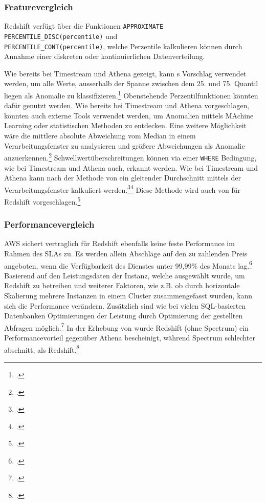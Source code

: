 \subsubsection{Featurevergleich}
Redshift verfügt über die Funktionen \texttt{APPROXIMATE PERCENTILE_DISC(percentile)} und \\ \texttt{PERCENTILE_CONT(percentile)}, welche Perzentile kalkulieren können durch Annahme einer diskreten oder kontinuierlichen Datenverteilung.

Wie bereits bei Timestream und Athena gezeigt, kann \citeauthor{Salgado.2019}s Vorschlag verwendet werden, um alle Werte, ausserhalb der Spanne zwischen dem 25. und 75. Quantil liegen als Anomalie zu klassifizieren.\footcite[Vgl.][]{Salgado.2019} Obenstehende Perzentilfunktionen könnten dafür genutzt werden. Wie bereits bei Timestream und Athena vorgeschlagen, könnten auch externe Tools verwendet werden, um Anomalien mittels MAchine Learning oder statistischen Methoden zu entdecken. Eine weitere Möglichkeit wäre die mittlere absolute Abweichung vom Median in einem Verarbeitungsfenster zu analysieren und größere Abweichungen als Anomalie anzuerkennen.\footcite[Vgl.][]{Peak.2017}
Schwellwertüberschreitungen können via einer \texttt{WHERE} Bedingung, wie bei Timestream und Athena auch, erkannt werden.
Wie bei Timestream und Athena kann nach der Methode von \citeauthor{Ross.2020} ein gleitender Durchschnitt mittels der Verarbeitungsfenster kalkuliert werden.\footcite[Vgl.][]{Ross.2020}\nzitat\footcite[Vgl.][]{Ubiq.o.J.} Diese Methode wird auch von \citeauthor{Ubiq.o.J.} für Redshift vorgeschlagen.\footcite[Vgl.][]{Ubiq.o.J.}

\subsubsection{Performancevergleich}
\ac{AWS} sichert vertraglich für Redshift ebenfalls keine feste Performance im Rahmen des \acp{SLA} zu. Es werden allein Abschläge auf den zu zahlenden Preis angeboten, wenn die Verfügbarkeit des Dienstes unter 99,99\% des Monats lag.\footcite[Vgl.][]{AmazonWebServicesInc..2019b} Basierend auf den Leistungsdaten der Instanz, welche ausgewählt wurde, um Redshift zu betreiben und weiterer Faktoren, wie z.B. ob durch horizontale Skalierung mehrere Instanzen in einem Cluster zusammengefasst wurden, kann sich die Performance verändern. Zusätzlich sind wie bei vielen \ac{SQL}-basierten Datenbanken Optimierungen der Leistung durch Optimierung der gestellten Abfragen möglich.\footcite[Vgl.][]{AmazonWebServicesInc..o.J.ab} In der Erhebung von \citeauthor{Tan.2019} wurde Redshift (ohne Spectrum) ein Performancevorteil gegenüber Athena bescheinigt, während Spectrum schlechter abschnitt, als Redshift.\footcite[Vgl.][2176]{Tan.2019}


